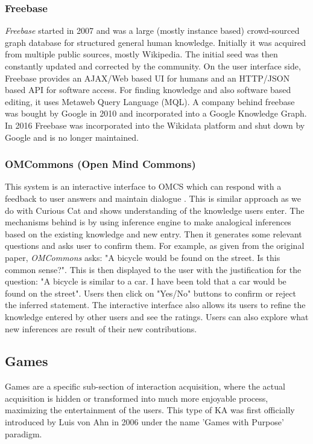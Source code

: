 \subsubsection{Freebase}
\label{section:r:freebase}
\emph{Freebase} started in 2007\parencite{Bollacker2008} and was a large (mostly
instance based) crowd-sourced graph database for structured general human 
knowledge. Initially it was acquired from multiple public sources, mostly 
Wikipedia. The initial seed was then constantly updated and corrected by the 
community. On the user interface side, Freebase provides an AJAX/Web based 
UI for humans and an HTTP/JSON based API for software access. For finding
knowledge and also software based editing, it uses Metaweb Query Language 
(MQL). A company behind freebase was bought by Google in 2010 and incorporated
into a Google Knowledge Graph. In 2016 Freebase was incorporated into the 
Wikidata platform and shut down by Google and is no longer maintained.

\subsubsection{OMCommons (Open Mind Commons)}
\label{section:r:omc}
This system is an interactive interface to OMCS which
can respond with a feedback to user answers and maintain dialogue 
\parencite{Speer2007}. This is similar approach as we do with Curious Cat and
shows understanding of the knowledge users enter. The mechanisms behind is
by using inference engine to make analogical inferences based on the existing 
knowledge and new entry. Then it generates some relevant questions and asks 
user to confirm them. For example, as given from the original paper, 
\emph{OMCommons} asks: "A bicycle would be found on the street. Is this common 
sense?". This is then displayed to the user with the justification for the 
question: "A bicycle is similar to a car. I have been told that a car would 
be found on the street". Users then click on "Yes/No" buttons to confirm or
reject the inferred statement. The interactive interface also allows its users 
to refine the knowledge entered by other users and see the ratings. Users can 
also explore what new inferences are result of their new contributions.

\subsection{Games}
\label{section:r:games}
Games are a specific sub-section of interaction acquisition, where the actual
acquisition is hidden or transformed into much more enjoyable process, 
maximizing the entertainment of the users. This type of KA was first 
officially introduced by Luis von Ahn in 2006 \parencite{VonAhn2006,
VonAhn2008} under the name 'Games with Purpose' paradigm.

